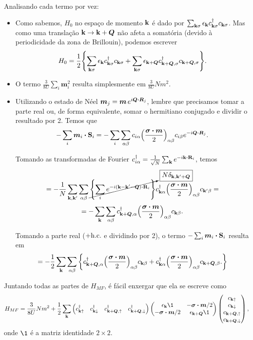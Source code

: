 \documentclass[a4paper,10pt]{article}
\begin{document}
\n

Analisando cada termo por vez:
\begin{itemize}
\item Como sabemos, $H_0$ no espaço de momento $\vb{k}$ é dado por $\sum_{\vb{k}\sigma} \epsilon_{\vb{k}} c_{\vb{k}\sigma}^\dagger c_{\vb{k}\sigma}$. Mas como uma translação $\vb{k} \to \vb{k} + \bm{Q}$ não afeta a somatória (devido à periodicidade da zona de Brillouin), podemos escrever
$$
H_0 = \frac{1}{2}
\qty{
\sum_{\vb{k}\sigma} \epsilon_{\vb{k}} c_{\vb{k}\sigma}^\dagger c_{\vb{k}\sigma} +
\sum_{\vb{k}\sigma} \epsilon_{\vb{k}+\bm{Q}} c_{\vb{k}+\bm{Q},\sigma}^\dagger c_{\vb{k}+\bm{Q},\sigma}
}.
$$

\item O termo $\frac{3}{8U} \sum_{i} \bm{m}_i^2$ resulta simplesmente em $\frac{3}{8U} N m^2$.

\item Utilizando o estado de Néel $\bm{m}_j = \bm{m} \, e^{i \bm{Q} \vdot \bm{R}_j}$, lembre que precisamos tomar a parte real ou, de forma equivalente, somar o hermitiano conjugado e dividir o resultado por 2. Temos que
$$
- \sum_{i} \bm{m}_i \vdot \S_i = -\sum_{i}\sum_{\alpha \beta} c_{i\alpha} \qty(\frac{\bm{\s} \vdot \bm{m}}{2})_{\alpha \beta} c_{i\beta} e^{-i\bm{Q} \vdot \bm{R}_j}.
$$

Tomando as transformadas de Fourier $c_{i\alpha}^\d = \frac{1}{\sqrt{N}} \sum_{\k} e^{-i\k\vdot\R_i}$, temos
$$
= -\frac{1}{N} \sum_{\k,\k'} \sum_{\alpha \beta}
\cancelto{\boxed{N \delta_{\k,\k'+\bm{Q}}}}{\qty{\sum_{i} e^{-i(\k-\k'-\bm{Q})\vdot\R_i}}}
c_{\k\alpha}^\d \qty(\frac{\bm{\s}\vdot\bm{m}}{2})_{\alpha\beta} c_{\k'\beta} =
$$
$$
= - \sum_{\k} \sum_{\alpha \beta}
c_{\k+\bm{Q},\alpha}^\d \qty(\frac{\bm{\s}\vdot\bm{m}}{2})_{\alpha\beta} c_{\k\beta}.
$$


Tomando a parte real ($+ \text{h.c.}$ e dividindo por 2), o termo $-\sum_{i} \bm{m}_i \vdot \S_i$ resulta em
$$
= - \frac{1}{2} \sum_{\k} \sum_{\alpha\beta}
\qty{
c_{\k+\bm{Q},\alpha}^\d \qty(\frac{\bm{\s}\vdot\bm{m}}{2})_{\alpha\beta} c_{\k\beta}+
c_{\k\alpha}^\d \qty(\frac{\bm{\s}\vdot\bm{m}}{2})_{\alpha\beta} c_{\k+\bm{Q},\beta}.
}
$$
\end{itemize}

Juntando todas as partes de $H_{MF}$, é fácil enxergar que ela se escreve como
$$
H_{MF} = \frac{3}{8U} Nm^2 + \frac{1}{2} \sum_{\k}
\begin{pmatrix}
c_{\k\up}^{\d} & c_{\k\down}^{\d} & c_{\k+\bm{Q},\up}^{\d} & c_{\k+\bm{Q},\down}^{\d}
\end{pmatrix}
\begin{pmatrix}
\eps_{\k} \1 & -\bm{\s} \vdot \bm{m}/2 \\
-\bm{\s} \vdot \bm{m}/2 & \eps_{\k+\bm{Q}} \1
\end{pmatrix}
\begin{pmatrix}
c_{\k\up} \\ c_{\k\down} \\ c_{\k+\bm{Q},\up} \\ c_{\k+\bm{Q},\down}
\end{pmatrix},
$$
onde $\1$ é a matriz identidade $2 \times 2$.
\end{document}
